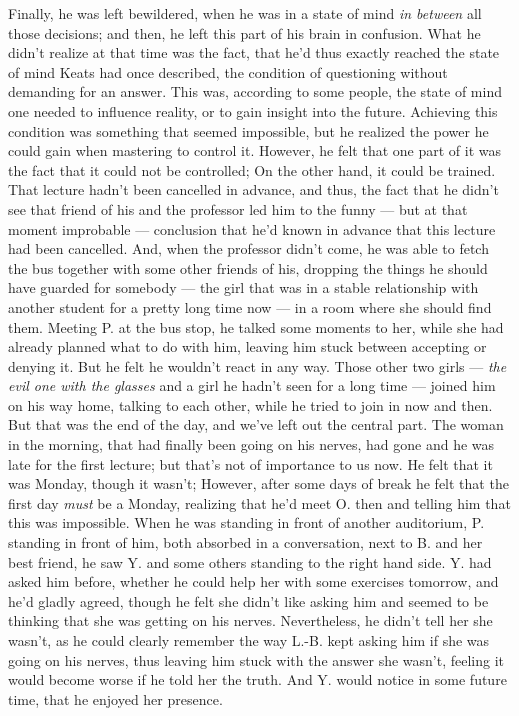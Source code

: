 Finally, he was left bewildered, when he was in a state of mind \emph{in between} all those decisions; and then, he left this part of his brain in confusion. What he didn't realize at that time was the fact, that he'd thus exactly reached the state of mind Keats had once described, the condition of questioning without demanding for an answer. This was, according to some people, the state of mind one needed to influence reality, or to gain insight into the future. Achieving this condition was something that seemed impossible, but he realized the power he could gain when mastering to control it. However, he felt that one part of it was the fact that it could not be controlled; On the other hand, it could be trained. 
That lecture hadn't been cancelled in advance, and thus, the fact that he didn't see that friend of his and the professor led him to the funny --- but at that moment improbable --- conclusion that he'd known in advance that this lecture had been cancelled. And, when the professor didn't come, he was able to fetch the bus together with some other friends of his, dropping the things he should have guarded for somebody --- the girl that was in a stable relationship with another student for a pretty long time now --- in a room where she should find them. Meeting P. at the bus stop, he talked some moments to her, while she had already planned what to do with him, leaving him stuck between accepting or denying it. But he felt he wouldn't react in any way. Those other two girls --- \emph{the evil one with the glasses} and a girl he hadn't seen for a long time --- joined him on his way home, talking to each other, while he tried to join in now and then. 
But that was the end of the day, and we've left out the central part. The woman in the morning, that had finally been going on his nerves, had gone and he was late for the first lecture; but that's not of importance to us now. 
He felt that it was Monday, though it wasn't; However, after some days of break he felt that the first day \emph{must} be a Monday, realizing that he'd meet O. then and telling him that this was impossible. 
When he was standing in front of another auditorium, P. standing in front of him, both absorbed in a conversation, next to B. and her best friend, he saw Y. and some others standing to the right hand side. Y. had asked him before, whether he could help her with some exercises tomorrow, and he'd gladly agreed, though he felt she didn't like asking him and seemed to be thinking that she was getting on his nerves. Nevertheless, he didn't tell her she wasn't, as he could clearly remember the way L.-B. kept asking him if she was going on his nerves, thus leaving him stuck with the answer she wasn't, feeling it would become worse if he told her the truth. And Y. would notice in some future time, that he enjoyed her presence. 
